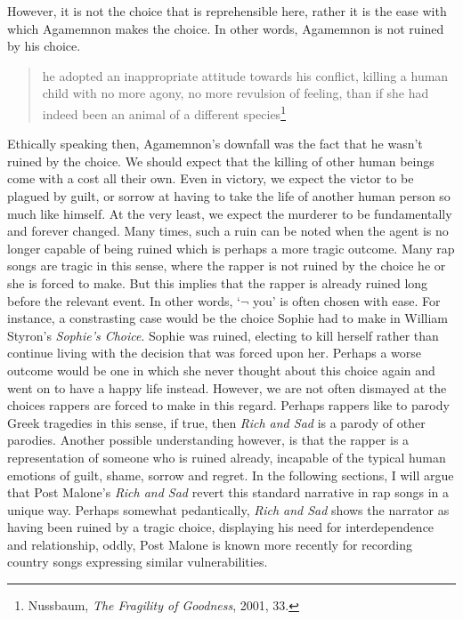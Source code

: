 \documentclass[phdthesis,12pt,final]{wuthesis}
\theoremstyle{definition}
\theoremstyle{definition}
\theoremstyle{definition}
\theoremstyle{definition}
\theoremstyle{remark}
\begin{document}
However, it is not the choice that is reprehensible here, rather it is the ease with which Agamemnon makes the choice. In other words, Agamemnon is not ruined by his choice.

\begin{quote}
he adopted an inappropriate attitude towards his conflict, killing a human child with no more agony, no more revulsion of feeling, than if she had indeed been an animal of a different species\footnote{Nussbaum, \emph{The {Fragility} of {Goodness}}, 2001, 33.}
\end{quote}

Ethically speaking then, Agamemnon's downfall was the fact that he wasn't ruined by the choice. We should expect that the killing of other human beings come with a cost all their own. Even in victory, we expect the victor to be plagued by guilt, or sorrow at having to take the life of another human person so much like himself. At the very least, we expect the murderer to be fundamentally and forever changed. Many times, such a ruin can be noted when the agent is no longer capable of being ruined which is perhaps a more tragic outcome. Many rap songs are tragic in this sense, where the rapper is not ruined by the choice he or she is forced to make. But this implies that the rapper is already ruined long before the relevant event. In other words, `\(\lnot\) you' is often chosen with ease. For instance, a constrasting case would be the choice Sophie had to make in William Styron's \emph{Sophie's Choice}. Sophie was ruined, electing to kill herself rather than continue living with the decision that was forced upon her. Perhaps a worse outcome would be one in which she never thought about this choice again and went on to have a happy life instead. However, we are not often dismayed at the choices rappers are forced to make in this regard. Perhaps rappers like to parody Greek tragedies in this sense, if true, then \emph{Rich and Sad} is a parody of other parodies. Another possible understanding however, is that the rapper is a representation of someone who is ruined already, incapable of the typical human emotions of guilt, shame, sorrow and regret. In the following sections, I will argue that Post Malone's \emph{Rich and Sad} revert this standard narrative in rap songs in a unique way. Perhaps somewhat pedantically, \emph{Rich and Sad} shows the narrator as having been ruined by a tragic choice, displaying his need for interdependence and relationship, oddly, Post Malone is known more recently for recording country songs expressing similar vulnerabilities.
\end{document}
